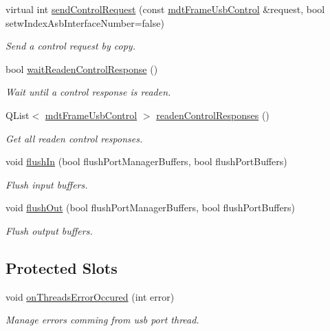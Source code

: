\begin{DoxyCompactItemize}
virtual int \hyperlink{classmdt_usb_port_manager_aea4a67550effcba13acfc110d6d30c3e}{send\-Control\-Request} (const \hyperlink{classmdt_frame_usb_control}{mdt\-Frame\-Usb\-Control} \&request, bool setw\-Index\-Asb\-Interface\-Number=false)
\begin{DoxyCompactList}\small\item\em Send a control request by copy. \end{DoxyCompactList}\item 
bool \hyperlink{classmdt_usb_port_manager_a34bf0ac118e586bf2547a98964a2230c}{wait\-Readen\-Control\-Response} ()
\begin{DoxyCompactList}\small\item\em Wait until a control response is readen. \end{DoxyCompactList}\item 
Q\-List$<$ \hyperlink{classmdt_frame_usb_control}{mdt\-Frame\-Usb\-Control} $>$ \hyperlink{classmdt_usb_port_manager_a84c26fee7dfb26290659aa002e0842c6}{readen\-Control\-Responses} ()
\begin{DoxyCompactList}\small\item\em Get all readen control responses. \end{DoxyCompactList}\item 
void \hyperlink{classmdt_usb_port_manager_a982256ed17db155e1c95d544683a6dba}{flush\-In} (bool flush\-Port\-Manager\-Buffers, bool flush\-Port\-Buffers)
\begin{DoxyCompactList}\small\item\em Flush input buffers. \end{DoxyCompactList}\item 
void \hyperlink{classmdt_usb_port_manager_ab723086376175c40635df44adf358985}{flush\-Out} (bool flush\-Port\-Manager\-Buffers, bool flush\-Port\-Buffers)
\begin{DoxyCompactList}\small\item\em Flush output buffers. \end{DoxyCompactList}\end{DoxyCompactItemize}
\subsection*{Protected Slots}
\begin{DoxyCompactItemize}
\item 
void \hyperlink{classmdt_usb_port_manager_ad6cbef2c218efe73fdad6d5f598f743f}{on\-Threads\-Error\-Occured} (int error)
\begin{DoxyCompactList}\small\item\em Manage errors comming from usb port thread. \end{DoxyCompactList}\end{DoxyCompactItemize}
